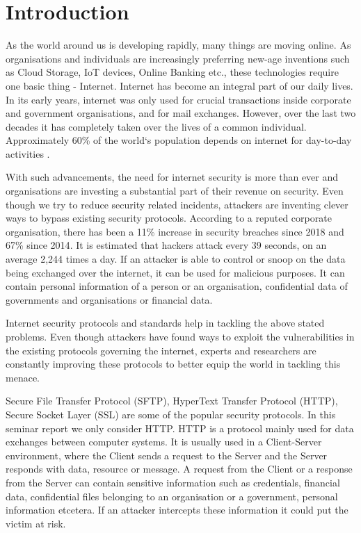 \chapter{Introduction}

As the world around us is developing rapidly, many things are moving online. As organisations and individuals are increasingly preferring new-age inventions such as Cloud Storage, IoT devices, Online Banking etc., these technologies require one basic thing - Internet. Internet has become an integral part of our daily lives. In its early years, internet was only used for crucial transactions inside corporate and government organisations, and for mail exchanges. However, over the last two decades it has completely taken over the lives of a common individual. Approximately 60\% of the world`s population depends on internet for day-to-day activities \cite{b16}. 

With such advancements, the need for internet security is more than ever and organisations are investing a substantial part of their revenue on security\cite{b2}. Even though we try to reduce security related incidents, attackers are inventing clever ways to bypass existing security protocols. According to a reputed corporate organisation, there has been a 11\% increase in security breaches since 2018 and 67\% since 2014\cite{b3}. It is estimated that hackers attack every 39 seconds, on an average 2,244 times a day\cite{b4}. If an attacker is able to control or snoop on the data being exchanged over the internet, it can be used for malicious purposes. It can contain personal information of a person or an organisation, confidential data of governments and organisations or financial data.

Internet security protocols and standards help in tackling the above stated problems. Even though attackers have found ways to exploit the vulnerabilities in the existing protocols governing the internet, experts and researchers are constantly improving these protocols to better equip the world in tackling this menace.  

Secure File Transfer Protocol (SFTP), HyperText Transfer Protocol (HTTP), Secure Socket Layer (SSL) are some of the popular security protocols. In this seminar report we only consider HTTP. HTTP is a protocol mainly used for data exchanges between computer systems. It is usually used in a Client-Server environment, where the Client sends a request to the Server and the Server responds with data, resource or message. A request from the Client or a response from the Server can contain sensitive information such as credentials, financial data, confidential files belonging to an organisation or a government, personal information etcetera. If an attacker intercepts these information it could put the victim at risk.  

